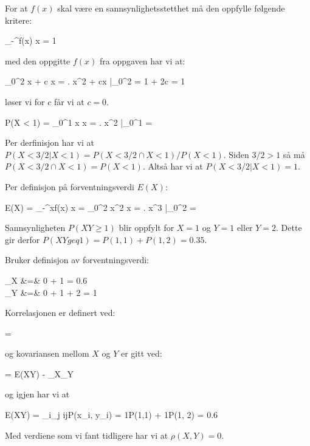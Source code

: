 \oppgave
\deloppgave
For at $f(x)$ skal være en sannsynlighetsstetthet må den oppfylle følgende kritere:
\begin{likning}
	\int_{-\infty}^\infty f(x) \dd x = 1
\end{likning}
med den oppgitte $f(x)$ fra oppgaven har vi at:
\begin{likning}
	\int_{0}^2 x + c \dd x = \left. x^2 + cx \right|_0^2 = 1 + 2c = 1
\end{likning}
løser vi for $c$ får vi at $c = 0$.

\deloppgave
\begin{utregning}
	P(X < 1) = \int_0^1 x \dd x = \left. x^2 \right|_0^1 = 
\end{utregning}

\deloppgave
Per derfinisjon har vi at $P(X < 3/2 | X < 1) = P(X < 3/2 \cap X < 1)/P(X < 1)$. Siden $3/2 > 1$ så må $P(X < 3/2 \cap X < 1) = P(X < 1)$. Altså har vi at $P(X < 3/2 | X < 1) = 1$.

\deloppgave
Per definisjon på forventningsverdi $E(X)$:
\begin{likning}
	E(X) = \int_{-\infty}^\infty xf(x) \dd x = \int_0^2 x^2 \dd x = \left. x^3 \right|_0^2 = 
\end{likning}

\oppgave
\deloppgave
Sannsynligheten $P(XY \geq 1)$ blir oppfylt for $X = 1$ og $Y = 1$ eller $Y = 2$. Dette gir derfor $P(XY geq 1) = P(1, 1) + P(1, 2) = 0.35$.

\deloppgave
Bruker definisjon av forventningsverdi:
\begin{utregning}
	\mu_X &=& 0 + 1 = 0.6\\
	\mu_Y &=& 0 + 1 + 2 = 1
\end{utregning}

\deloppgave
Korrelasjonen er definert ved:
\begin{likning}
	 = 
\end{likning}
og kovariansen mellom $X$ og $Y$ er gitt ved:
\begin{likning}
	 = E(XY) - \mu_X\mu_Y
\end{likning}
og igjen har vi at
\begin{likning}
	E(XY) = \sum_i\sum_j ijP(x_i, y_i) = 1\cdot P(1,1) + 1\cdot P(1, 2) = 0.6
\end{likning}
Med verdiene som vi fant tidligere har vi at $\rho(X, Y) = 0$.


